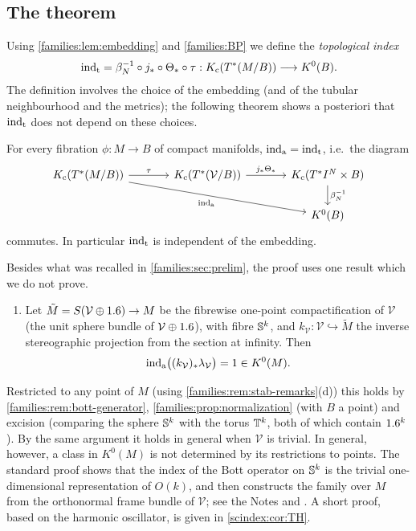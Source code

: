 \subsection{The theorem}
Using \cref{families:lem:embedding} and \ref{families:BP} we define the
\emph{topological index}
\begin{equation}\label{families:eq:indt}
  \operatorname{ind}_{\mathrm{t}}=\beta_N^{-1}\circ j_*\circ\Theta_*\circ\tau:K_{\mathrm{c}}(T^*(M/B))
  \longrightarrow K^0(B).
\end{equation}
The definition involves the choice of the embedding (and of the tubular
neighbourhood and the metrics); the following theorem shows a posteriori that
$\operatorname{ind}_{\mathrm{t}}$ does not depend on these choices.

\begin{theorem}\label{families:thm:AS-K}
  For every fibration $\phi:M\to B$ of compact manifolds, $\operatorname{ind}_{\mathrm{a}}=\operatorname{ind}_{\mathrm{t}}$, i.e.\
  the diagram
  \begin{equation*}
    \begin{tikzcd}[column sep=large]
      \Kc(T^*(M/B))\arrow[r,"\tau"]\arrow[drr,"\inda"']&
      \Kc(T^*(\mathcal V/B))\arrow[r,"j_*\Theta_*"]&
      \Kc(T^*I^N\times B)\arrow[d,"\beta_N^{-1}"]\\
      &&K^0(B)
    \end{tikzcd}
  \end{equation*}
  commutes. In particular $\operatorname{ind}_{\mathrm{t}}$ is independent of the embedding.
\end{theorem}

Besides what was recalled in \cref{families:sec:prelim}, the proof uses one
result which we do not prove.
\begin{enumerate}[label=(TH)]
\item\label{families:TH} Let $\tilde M=S(\mathcal V\oplus1.6)\to M$ be the
  fibrewise one-point compactification of $\mathcal V$ (the unit sphere bundle
  of $\mathcal V\oplus1.6$), with fibre $\mathbb{S}^k$, and
  $k_{\mathcal V}:\mathcal V\hookrightarrow\tilde M$ the inverse stereographic
  projection from the section at infinity. Then
  \begin{equation*}
    \operatorname{ind}_{\mathrm{a}}\bigl((k_{\mathcal V})_*\lambda_{\mathcal V}\bigr)=1\in K^0(M).
  \end{equation*}
\end{enumerate}
Restricted to any point of $M$ (using \cref{families:rem:stab-remarks}(d))
this holds by \cref{families:rem:bott-generator},
\cref{families:prop:normalization} (with $B$ a point) and excision (comparing the sphere $\mathbb{S}^k$ with the torus
$\mathbb{T}^k$, both of which contain $1.6^k$). By the same argument it holds in
general when $\mathcal V$ is trivial. In general, however, a class in $K^0(M)$
is not determined by its restrictions to points. The standard proof shows that
the index of the Bott operator on $\mathbb{S}^k$ is the trivial one-dimensional
representation of $O(k)$, and then constructs the family over $M$ from the
orthonormal frame bundle of $\mathcal V$; see the Notes and
\cite{Atiyah-Singer-IV}. A short proof, based on the harmonic oscillator, is given in
\cref{scindex:cor:TH}.

